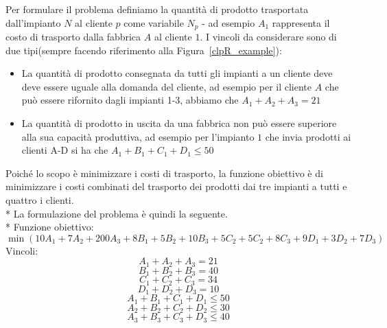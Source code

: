 \documentclass[12pt,a4paper,openright,twoside]{report}
\begin{document}
Per formulare il problema definiamo la quantità di prodotto trasportata dall'impianto $N$ al cliente $p$ come variabile $N_p$ - ad esempio $A_1$ rappresenta il costo di trasporto dalla fabbrica $A$ al cliente $1$. I vincoli da considerare sono di due tipi(sempre facendo riferimento alla Figura~\ref{clpR_example}):
\begin{itemize}
\item La quantità di prodotto consegnata da tutti gli impianti a un cliente deve deve essere uguale alla domanda del cliente, ad esempio per il cliente $A$ che può essere rifornito dagli impianti 1-3, abbiamo che $A_1+A_2+A_3=21$
\item La quantità di prodotto in uscita da una fabbrica non può essere superiore alla sua capacità produttiva, ad esempio per l'impianto $1$ che invia prodotti ai clienti A-D si ha che $A_1+B_1+C_1+D_1 \leq 50$
\end{itemize}   
Poiché lo scopo è minimizzare i costi di trasporto, la funzione obiettivo è di minimizzare i costi combinati del trasporto dei prodotti dai tre impianti a tutti e quattro i clienti.\\*
La formulazione del problema è quindi la seguente.\\*
Funzione obiettivo: 
\begin{equation}  \label{exampleClpRObiett}
	\min(10A_1+7A_2+200A_3+8B_1+5B_2+10B_3+5C_2+5C_2+8C_3+9D_1+3D_2+7D_3)
\end{equation}
Vincoli:
\begin{equation}  \label{exampleCons1}
	A_1+A_2+A_3=21
\end{equation}
\begin{equation}  \label{exampleCons2}
	B_1+B_2+B_3=40
\end{equation}
\begin{equation}  \label{exampleCons3}
	C_1+C_2+C_3=34
\end{equation}
\begin{equation}  \label{exampleCons4}
	D_1+D_2+D_3=10
\end{equation}
\begin{equation}  \label{exampleCons5}
	A_1+B_1+C_1+D_1 \leq 50
\end{equation}
\begin{equation}  \label{exampleCons6}
	A_2+B_2+C_2+D_2 \leq 30
\end{equation}
\begin{equation}  \label{exampleCons7}
	A_3+B_3+C_3+D_3 \leq 40
\end{equation}
\end{document}
